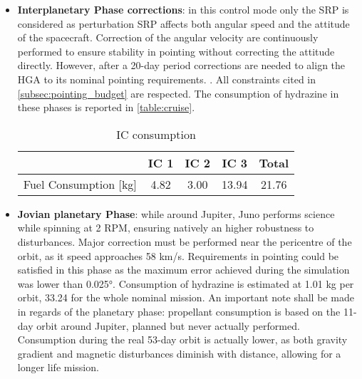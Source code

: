 \begin{itemize}
    \item \textbf{Interplanetary Phase corrections}: in this control mode only the SRP is considered as perturbation SRP affects both angular speed and the attitude of the spacecraft. Correction of the angular velocity are continuously performed to ensure stability in pointing without correcting the attitude directly. However, after a 20-day period corrections are needed to align the HGA to its nominal pointing requirements. \cite{LL_early_cruise}. All constraints cited in \autoref{subsec:pointing_budget} are respected. 
    The consumption of hydrazine in these phases is reported in \autoref{table:cruise}.

    \begin{table}[H]
        \renewcommand{\arraystretch}{1.3}
        \centering
        \begin{tabular}{|c|c|c|c|c|}
            \hline
            &\textbf{IC 1} &\textbf{IC 2} & \textbf{IC 3} &\textbf{Total}\\
            \hline
            \hline
            Fuel Consumption [kg] & 4.82 & 3.00 & 13.94 & 21.76 \\
            \hline
        \end{tabular}
        \caption{IC consumption}
        \label{table:cruise}
    \end{table}

    \item \textbf{Jovian planetary Phase}: while around Jupiter, Juno performs science while spinning at 2 RPM, ensuring natively an higher robustness to disturbances. Major correction must be performed near the pericentre of the orbit, as it speed approaches 58 km/s.  
    Requirements in pointing could be satisfied in this phase as the maximum error achieved during the simulation was lower than 0.025°.  Consumption of hydrazine is estimated at 1.01 kg per orbit, 33.24 for the whole nominal mission.
    An important note shall be made in regards of the planetary phase: propellant consumption is based on the 11-day orbit around Jupiter, planned but never actually performed. Consumption during the real 53-day orbit is actually lower, as both gravity gradient and magnetic disturbances diminish with distance, allowing for a longer life mission. 
    
\end{itemize}